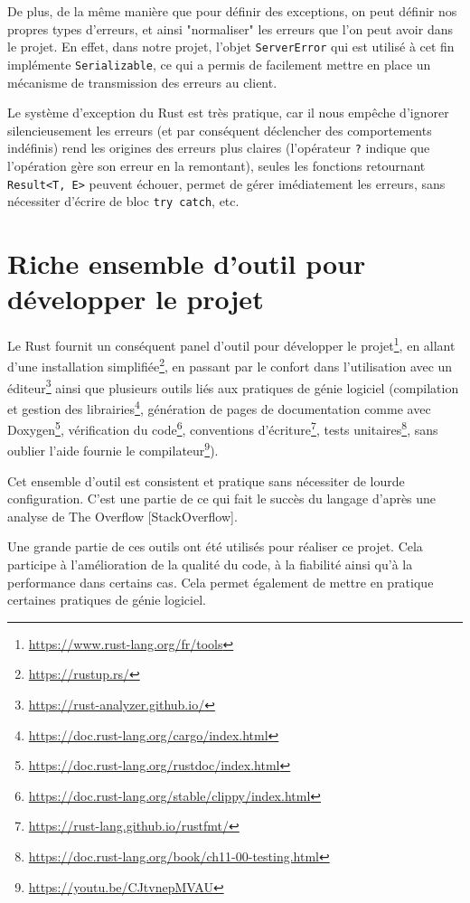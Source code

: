 \documentclass{EPUProjetDi}
\begin{document}
De plus, de la même manière que pour définir des exceptions, on peut définir nos propres types d'erreurs, et ainsi "normaliser" les erreurs que l'on peut avoir dans le projet. En effet, dans notre projet, l'objet \verb|ServerError| qui est utilisé à cet fin implémente \verb|Serializable|, ce qui a permis de facilement mettre en place un mécanisme de transmission des erreurs au client.

Le système d'exception du Rust est très pratique, car il nous empêche d'ignorer silencieusement les erreurs (et par conséquent déclencher des comportements indéfinis) rend les origines des erreurs plus claires (l'opérateur \verb|?| indique que l'opération gère son erreur en la remontant), seules les fonctions retournant \verb|Result<T, E>| peuvent échouer, permet de gérer imédiatement les erreurs, sans nécessiter d'écrire de bloc \verb|try catch|, etc.

\section{Riche ensemble d'outil pour développer le projet}

Le Rust fournit un conséquent panel d'outil pour développer le projet\footnote{\url{https://www.rust-lang.org/fr/tools}}, en allant d'une installation simplifiée\footnote{\url{https://rustup.rs/}}, en passant par le confort dans l'utilisation avec un éditeur\footnote{\url{https://rust-analyzer.github.io/}} ainsi que plusieurs outils liés aux pratiques de génie logiciel (compilation et gestion des librairies\footnote{\url{https://doc.rust-lang.org/cargo/index.html}}, génération de pages de documentation comme avec Doxygen\footnote{\url{https://doc.rust-lang.org/rustdoc/index.html}}, vérification du code\footnote{\url{https://doc.rust-lang.org/stable/clippy/index.html}}, conventions d'écriture\footnote{\url{https://rust-lang.github.io/rustfmt/}}, tests unitaires\footnote{\url{https://doc.rust-lang.org/book/ch11-00-testing.html}}, sans oublier l'aide fournie le compilateur\footnote{\url{https://youtu.be/CJtvnepMVAU}}).

Cet ensemble d'outil est consistent et pratique sans nécessiter de lourde configuration. C'est une partie de ce qui fait le succès du langage d'après une analyse de The Overflow [StackOverflow]\cite{stackoverflowloverust}\cite{stackoverflowrustpopular}.

Une grande partie de ces outils ont été utilisés pour réaliser ce projet. Cela participe à l'amélioration de la qualité du code, à la fiabilité ainsi qu'à la performance dans certains cas. Cela permet également de mettre en pratique certaines pratiques de génie logiciel.
\end{document}
